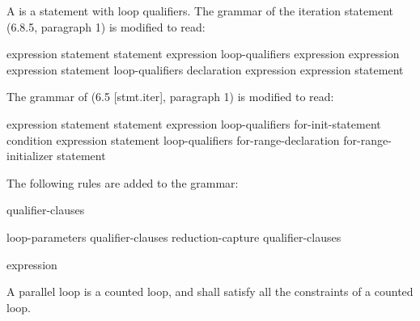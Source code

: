 
\pnum
A
is a
statement with loop qualifiers.
The grammar of the iteration statement (6.8.5, paragraph 1)
is modified to read:

\begin{bnf}
\br
{} \terminal{(} expression \terminal{)} statement
\br
{} statement  \terminal{(} expression \terminal{)} \terminal{;}
\br
loop-qualifiers\opt{}  \terminal{(}
expression\opt{} \terminal{;}
expression\opt{} \terminal{;}
expression\opt{} \terminal{)} statement
\br
loop-qualifiers\opt{}  \terminal{(}
declaration
expression\opt{} \terminal{;}
expression\opt{} \terminal{)} statement
\end{bnf}

\begin{cpp}
The grammar of
(6.5 [stmt.iter], paragraph 1)
is modified to read:

\begin{bnf}
\br
{} \terminal{(} expression \terminal{)} statement
\br
{} statement  \terminal{(} expression \terminal{)} \terminal{;}
\br
loop-qualifiers\opt{}  \terminal{(}
for-init-statement
condition\opt{} \terminal{;}
expression\opt{} \terminal{)} statement
\br
loop-qualifiers\opt{}  \terminal{(}
for-range-declaration \terminal{:}
for-range-initializer \terminal{)} statement
\end{bnf}

\end{cpp}

\pnum
The following rules are added to the grammar:

\begin{bnf}
\br
{} qualifier-clauses\opt
\end{bnf}

\begin{bnf}
\br
loop-parameters qualifier-clauses\opt
\br
reduction-capture qualifier-clauses\opt
\end{bnf}

\begin{bnf}
\br
{} \terminal{(} expression \terminal{)}
\end{bnf}

\pnum
A parallel loop is a counted loop,
and shall satisfy all the constraints of a counted loop.


